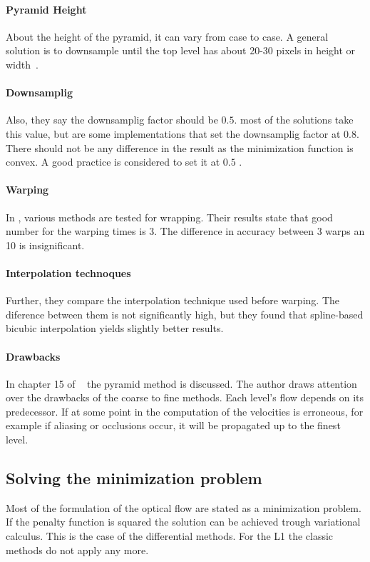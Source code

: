 \documentclass[12pt,a4paper,twoside]{report}
\begin{document}
\paragraph{Pyramid Height} \label{pyrHeight} About the height of the pyramid, it can vary from case to case. A general solution is to downsample until the top level has about 20-30 pixels in height or width~\cite{sun2010}. 

\paragraph{Downsamplig}Also, they say the downsamplig factor should be $0.5$. most of the solutions take this value, but are some implementations that set the downsamplig factor at $0.8$. There should not be any difference in the result as the minimization function is convex. A good practice is considered to set it at $0.5$ \cite{sun2010}.



\paragraph{Warping}In \cite{sun2010}, various methods are tested for wrapping. Their results state that good number for the warping times is 3. The difference in accuracy between 3 warps an 10 is insignificant.

\paragraph{Interpolation technoques} Further, they compare the interpolation technique used before warping.
The diference between them is not significantly high, but they found that spline-based bicubic interpolation yields slightly better results.

\paragraph{Drawbacks}In chapter 15 of ~\cite{fleet2006} the pyramid method is discussed. The author draws attention over the drawbacks of the coarse to fine methods. Each level's flow depends on its predecessor. If at some point in the computation of the velocities is erroneous, for example if aliasing or occlusions occur, it will be propagated up to the finest level.
 
\subsection{Solving the minimization problem}
Most of the formulation of the optical flow are stated as a minimization problem. If the penalty function is squared the solution can be achieved trough variational calculus. This is the case of the differential methods. For the L1 the classic methods do not apply  any more.
\end{document}
